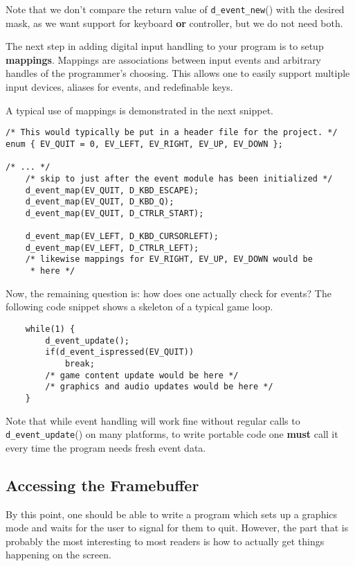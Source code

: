 Note that we don't compare the return value of {\tt d\_event\_new}()
with the desired mask, as we want support for keyboard {\bf or}
controller, but we do not need both.

The next step in adding digital input handling to your program is
to setup {\bf mappings}. Mappings are associations between input
events and arbitrary handles of the programmer's choosing. This
allows one to easily support multiple input devices, aliases for
events, and redefinable keys.

A typical use of mappings is demonstrated in the next snippet.

\begin{verbatim}
/* This would typically be put in a header file for the project. */
enum { EV_QUIT = 0, EV_LEFT, EV_RIGHT, EV_UP, EV_DOWN };

/* ... */
    /* skip to just after the event module has been initialized */
    d_event_map(EV_QUIT, D_KBD_ESCAPE);
    d_event_map(EV_QUIT, D_KBD_Q);
    d_event_map(EV_QUIT, D_CTRLR_START);

    d_event_map(EV_LEFT, D_KBD_CURSORLEFT);
    d_event_map(EV_LEFT, D_CTRLR_LEFT);
    /* likewise mappings for EV_RIGHT, EV_UP, EV_DOWN would be
     * here */
\end{verbatim}

Now, the remaining question is: how does one actually check for events?
The following code snippet shows a skeleton of a typical game loop.

\begin{verbatim}
    while(1) {
        d_event_update();
        if(d_event_ispressed(EV_QUIT))
            break;
        /* game content update would be here */
        /* graphics and audio updates would be here */
    }
\end{verbatim}

Note that while event handling will work fine without regular calls to
{\tt d\_event\_update}() on many platforms, to write portable code one
{\bf must} call it every time the program needs fresh event data.

\subsection{Accessing the Framebuffer}

By this point, one should be able to write a program which sets up a
graphics mode and waits for the user to signal for them to quit.
However, the part that is probably the most interesting to most
readers is how to actually get things happening on the screen.

